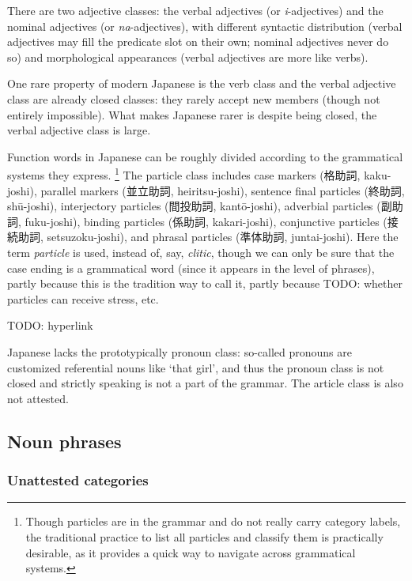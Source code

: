 \documentclass[UTF8, a4paper, oneside, scheme=plain]{ctexart}
\newcommand*{\term}[1]{\emph{#1}}
\newcommand{\corpus}[1]{\emph{#1}}
\newcommand{\translate}[1]{`#1'}
\begin{document}
There are two adjective classes:
the verbal adjectives (or \corpus{i}-adjectives)
and the nominal adjectives (or \corpus{na}-adjectives),
with different syntactic distribution 
(verbal adjectives may fill the predicate slot on their own; nominal adjectives never do so)
and morphological appearances
(verbal adjectives are more like verbs).

One rare property of modern Japanese is the verb class and the verbal adjective class 
are already closed classes:
they rarely accept new members (though not entirely impossible).
What makes Japanese rarer is despite being closed,
the verbal adjective class is large.

Function words in Japanese can be roughly divided according to the grammatical systems they express.%
\footnote{
    Though particles are in the grammar and do not really carry category labels,
    the traditional practice to list all particles and classify them 
    is practically desirable, 
    as it provides a quick way to navigate across grammatical systems.
}
The particle class includes
case markers (格助詞, kaku-joshi),
parallel markers (並立助詞, heiritsu-joshi),
sentence final particles (終助詞, shū-joshi),
interjectory particles (間投助詞, kantō-joshi),
adverbial particles (副助詞, fuku-joshi),
binding particles (係助詞, kakari-joshi),
conjunctive particles (接続助詞, setsuzoku-joshi),
and phrasal particles (準体助詞, juntai-joshi).
Here the term \term{particle} is used,
instead of, say, \term{clitic},
though we can only be sure that the case ending is a grammatical word 
(since it appears in the level of phrases),
partly because this is the tradition way to call it,
partly because TODO: whether particles can receive stress, etc.

TODO: hyperlink

Japanese lacks the prototypically pronoun class:
so-called pronouns are customized referential nouns like \translate{that girl},
and thus the pronoun class is not closed and strictly speaking is not a part of the grammar.
The article class is also not attested.

\subsection{Noun phrases}

\subsubsection{Unattested categories}
\end{document}
